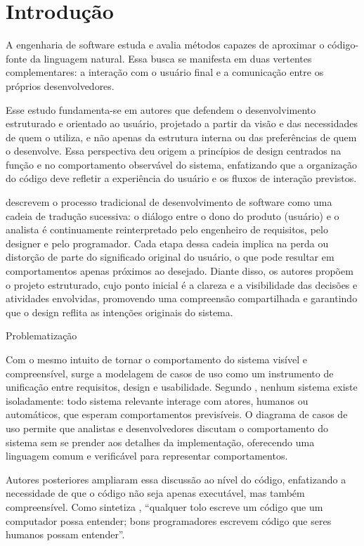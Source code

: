 \documentclass[12pt,a4paper]{article}
\begin{document}
\section{Introdução}

A engenharia de software estuda e avalia métodos capazes de aproximar o código-fonte da linguagem natural. Essa busca se manifesta em duas vertentes complementares: a interação com o usuário final e a comunicação entre os próprios desenvolvedores.

Esse estudo fundamenta-se em autores que defendem o desenvolvimento estruturado e orientado ao usuário, projetado a partir da visão e das necessidades de quem o utiliza, e não apenas da estrutura interna ou das preferências de quem o desenvolve. Essa perspectiva deu origem a princípios de design centrados na função e no comportamento observável do sistema, enfatizando que a organização do código deve refletir a experiência do usuário e os fluxos de interação previstos.

\textcite{yourdon1979structured} descrevem o processo tradicional de desenvolvimento de software como uma cadeia de tradução sucessiva: o diálogo entre o dono do produto (usuário) e o analista é continuamente reinterpretado pelo engenheiro de requisitos, pelo designer e pelo programador. Cada etapa dessa cadeia implica na perda ou distorção de parte do significado original do usuário, o que pode resultar em comportamentos apenas próximos ao desejado. Diante disso, os autores propõem o projeto estruturado, cujo ponto inicial é a clareza e a visibilidade das decisões e atividades envolvidas, promovendo uma compreensão compartilhada e garantindo que o design reflita as intenções originais do sistema.

Problematização

Com o mesmo intuito de tornar o comportamento do sistema visível e compreensível, surge a modelagem de casos de uso como um instrumento de unificação entre requisitos, design e usabilidade. Segundo \textcite{booch1999unified}, nenhum sistema existe isoladamente: todo sistema relevante interage com atores, humanos ou automáticos, que esperam comportamentos previsíveis. O diagrama de casos de uso permite que analistas e desenvolvedores discutam o comportamento do sistema sem se prender aos detalhes da implementação, oferecendo uma linguagem comum e verificável para representar comportamentos.

Autores posteriores ampliaram essa discussão ao nível do código, enfatizando a necessidade de que o código não seja apenas executável, mas também compreensível. Como sintetiza \textcite{fowler2018refactoring}, “qualquer tolo escreve um código que um computador possa entender; bons programadores escrevem código que seres humanos possam entender”.
\end{document}
